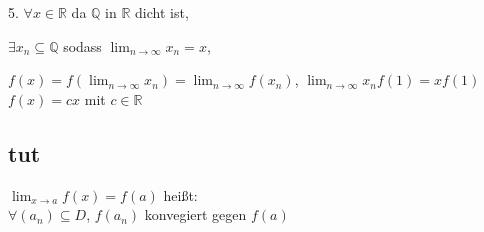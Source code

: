 5. $\forall x\in\mathbb{R}$ da $\mathbb{Q}$ in $\mathbb{R}$ dicht ist,

$\exists x_n\subseteq\mathbb{Q}$ sodass $\lim_{n\rightarrow\infty}x_n=x$,

$f(x)=f(\lim_{n\rightarrow\infty}x_n)=\lim_{n\rightarrow\infty}f(x_n)$, $\lim_{n\rightarrow\infty}x_nf(1)=xf(1)$\\

$f(x)=cx$ mit $c\in\mathbb{R}$

\newpage

\subsection{tut}

\begin{definition}[Stetigkeit]
$\lim_{x\rightarrow a}f(x)=f(a)$ heißt:\\

$\forall(a_n)\subseteq D$, $f(a_n)$ konvegiert gegen $f(a)$
\end{definition}
